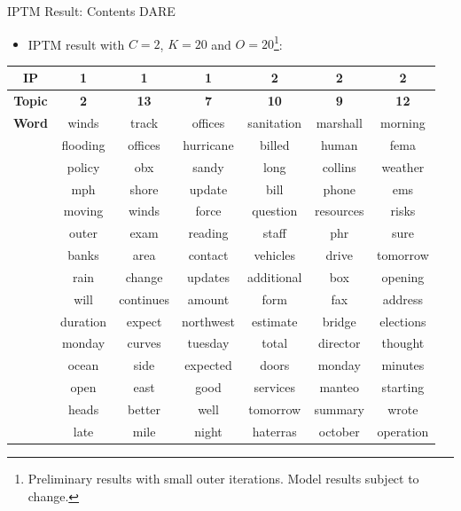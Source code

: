 \documentclass[10pt]{beamer}
\def\bni{\begin{itemize}} \def\ei{\end{itemize}}
\theoremstyle{definition}
\theoremstyle{remark}
\begin{document}
 \begin{frame}{IPTM Result: Contents DARE}
 	\bni \item IPTM result with $C=2$, $K=20$ and $O= 20$\footnote{Preliminary results with small outer iterations. Model results subject to change.}:
 	\ei
 	\scriptsize
\centering	\begin{table}[ht]
	\centering
	\begin{tabular}{ |c||c|c|c||c|c|c|} 
		\hline
		\textbf{IP} & \textbf{1} &  \textbf{1} & \textbf{1}  &\textbf{2} &\textbf{2}  &\textbf{2}  \\ \hline\hline
			\textbf{Topic} & \textbf{2} &  \textbf{13} & \textbf{7}  &\textbf{10} &\textbf{9}  &\textbf{12}  \\ \hline\hline
			\textbf{Word}& winds & track & offices & sanitation & marshall & morning\\
			&flooding & offices & hurricane & billed & human & fema\\
			&policy & obx & sandy & long & collins & weather\\
			&mph & shore &  update & bill & phone & ems\\
			&moving & winds & force & question & resources & risks \\
			&outer & exam & reading & staff & phr & sure\\
			&banks & area &  contact & vehicles & drive & tomorrow\\
			&rain & change & updates & additional & box & opening\\
			&will & continues & amount & form & fax & address\\
			&duration & expect & northwest &  estimate & bridge &  elections\\
			&monday & curves & tuesday &  total & director & thought\\
			&ocean & side & expected & doors & monday & minutes \\
			&open & east & good & services & manteo & starting\\
			&heads & better &  well & tomorrow & summary & wrote\\
			&late & mile & night & haterras & october & operation\\
			
				\hline
	\end{tabular}
\end{table}
\normalsize
\end{frame}
\end{document}
